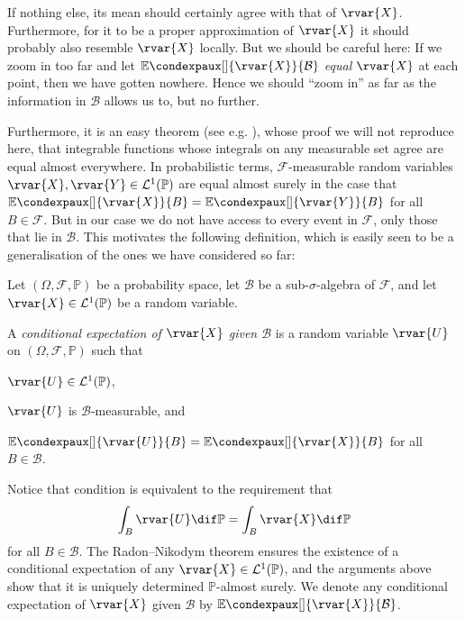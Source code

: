 \documentclass[article, a4paper, 11pt, oneside]{memoir}
\numberwithin{equation}{chapter}
\newcommand{\calB}{\mathcal{B}}
\newcommand{\calF}{\mathcal{F}}
\newcommand{\calL}{\mathcal{L}}
\renewcommand{\P}{\mathbb{P}}
\newcommand{\condexp}[3][]{{\mathbb{E}\condexpaux[#1]{#2}{#3}}}
\begin{document}
If nothing else, its mean should certainly agree with that of $\rvar{X}$. Furthermore, for it to be a proper approximation of $\rvar{X}$ it should probably also resemble $\rvar{X}$ locally. But we should be careful here: If we zoom in too far and let $\condexp{\rvar{X}}{\calB}$ \emph{equal} $\rvar{X}$ at each point, then we have gotten nowhere. Hence we should \enquote{zoom in} as far as the information in $\calB$ allows us to, but no further.

Furthermore, it is an easy theorem (see e.g. \cite[Sætning~10.2.1]{thorbjoernsen2014}), whose proof we will not reproduce here, that integrable functions whose integrals on any measurable set agree are equal almost everywhere. In probabilistic terms, $\calF$-measurable random variables $\rvar{X}, \rvar{Y} \in \calL^1(\P)$ are equal almost surely in the case that $\condexp{\rvar{X}}{B} = \condexp{\rvar{Y}}{B}$ for all $B \in \calF$. But in our case we do not have access to every event in $\calF$, only those that lie in $\calB$. This motivates the following definition, which is easily seen to be a generalisation of the ones we have considered so far:

\begin{definition}
    \label{def:conditional-expectation}
    Let $(\Omega, \calF, \P)$ be a probability space, let $\calB$ be a sub-$\sigma$-algebra of $\calF$, and let $\rvar{X} \in \calL^1(\P)$ be a random variable.

    A \emph{conditional expectation of $\rvar{X}$ given $\calB$} is a random variable $\rvar{U}$ on $(\Omega, \calF, \P)$ such that
    \begin{enumdef}
        \item $\rvar{U} \in \calL^1(\P)$,
        \item $\rvar{U}$ is $\calB$-measurable, and
        \item \label{enum:conditional-expectation-local-approx} $\condexp{\rvar{U}}{B} = \condexp{\rvar{X}}{B}$ for all $B \in \calB$.
    \end{enumdef}
\end{definition}
%
Notice that condition  is equivalent to the requirement that
%
\begin{equation*}
    \int_B \rvar{U} \dif\P
        = \int_B \rvar{X} \dif\P
\end{equation*}
%
for all $B \in \calB$. The Radon--Nikodym theorem ensures the existence of a conditional expectation of any $\rvar{X} \in \calL^1(\P)$, and the arguments above show that it is uniquely determined $\P$-almost surely. We denote any conditional expectation of $\rvar{X}$ given $\calB$ by $\condexp{\rvar{X}}{\calB}$.
\end{document}
